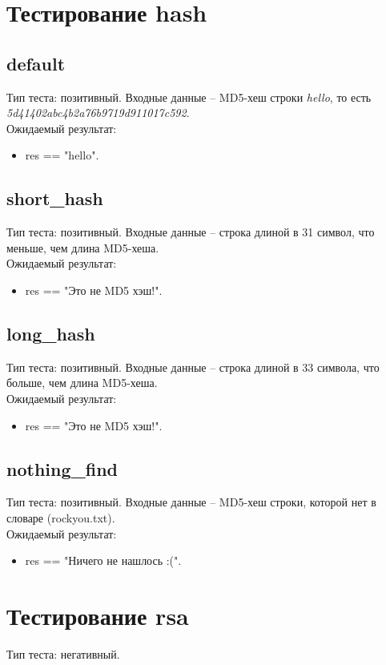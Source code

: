 \documentclass{article}
\begin{document}
\section{Тестирование hash}
\subsection{default}
Тип теста: позитивный.
Входные данные -- MD5-хеш строки \textit{hello}, то есть \textit{5d41402abc4b2a76b9719d911017c592}.\\
Ожидаемый результат: 
\begin{itemize}
    \item res == "hello". 
\end{itemize}

\subsection{short\_hash}
Тип теста: позитивный.
Входные данные -- строка длиной в 31 символ, что меньше, чем длина MD5-хеша.\\
Ожидаемый результат: 
\begin{itemize}
    \item res == "Это не MD5 хэш!". 
\end{itemize}

\subsection{long\_hash}
Тип теста: позитивный.
Входные данные -- строка длиной в 33 символа, что больше, чем длина MD5-хеша.\\
Ожидаемый результат: 
\begin{itemize}
    \item res == "Это не MD5 хэш!". 
\end{itemize}

\subsection{nothing\_find}
Тип теста: позитивный.
Входные данные -- MD5-хеш строки, которой нет в словаре (rockyou.txt).\\
Ожидаемый результат: 
\begin{itemize}
    \item res == "Ничего не нашлось :(". 
\end{itemize}

\section{Тестирование rsa}
Тип теста: негативный.
\end{document}

